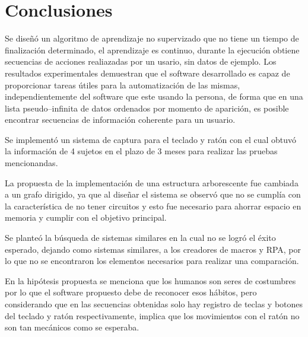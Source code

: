 \section{Conclusiones}


Se dise\~n\'o un algoritmo de aprendizaje no supervizado que no tiene un
 tiempo de finalizaci\'on determinado, el aprendizaje es continuo, durante la 
 ejecuci\'on obtiene secuencias de acciones realiazadas por un usario, sin 
 datos de ejemplo. Los resultados experimentales demuestran que el software 
 desarrollado es capaz de proporcionar tareas \'utiles para la 
 automatizaci\'on de las mismas, independientemente del software que este 
 usando la persona, de forma que en una lista pseudo--infinita de datos 
 ordenados por momento de aparici\'on, es posible encontrar secuencias de 
 informaci\'on coherente para un usuario.

 
Se implement\'o un sistema de captura para el teclado y rat\'on con el cual 
 obtuv\'o la informaci\'on de 4 sujetos en el plazo de 3 meses para 
 realizar las pruebas mencionandas.

	
La propuesta de la implementaci\'on de una estructura arborescente fue
 cambiada a un grafo dirigido, ya que al dise\~nar el sistema se observ\'o que 
 no se cumpl\'ia con la caracter\'istica de no tener circuitos y esto fue 
 necesario para ahorrar espacio en memoria y cumplir con el objetivo 
 principal.


Se plante\'o la b\'usqueda de sistemas similares en la cual no se logr\'o 
 el \'exito esperado, dejando como sistemas similares, a los creadores de
 macros y RPA, por lo que no se encontraron los elementos necesarios 
 para realizar una comparaci\'on.


En la hip\'otesis propuesta se menciona que los humanos son seres de 
 costumbres por lo que el software propuesto debe de reconocer esos h\'abitos, 
 pero considerando que en las secuencias obtenidas solo hay registro de teclas
 y botones del teclado y rat\'on respectivamente, implica que los movimientos
 con el rat\'on no son tan mec\'anicos como se esperaba.
